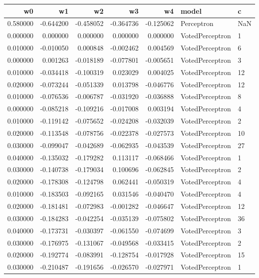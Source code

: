 \begin{tabular}{rrrrrll}
\toprule
w0 & w1 & w2 & w3 & w4 & model & c \\
\midrule
0.580000 & -0.644200 & -0.458052 & -0.364736 & -0.125062 & Perceptron & NaN \\
0.000000 & 0.000000 & 0.000000 & 0.000000 & 0.000000 & VotedPerceptron & 1 \\
0.010000 & -0.010050 & 0.000848 & -0.002462 & 0.004569 & VotedPerceptron & 6 \\
0.000000 & 0.001263 & -0.018189 & -0.077801 & -0.005651 & VotedPerceptron & 3 \\
0.010000 & -0.034418 & -0.100319 & 0.023029 & 0.004025 & VotedPerceptron & 12 \\
0.020000 & -0.073244 & -0.051339 & 0.013798 & -0.046776 & VotedPerceptron & 12 \\
0.010000 & -0.076536 & -0.006787 & -0.031920 & -0.036888 & VotedPerceptron & 8 \\
0.000000 & -0.085218 & -0.109216 & -0.017008 & 0.003194 & VotedPerceptron & 4 \\
0.010000 & -0.119142 & -0.075652 & -0.024208 & -0.032039 & VotedPerceptron & 2 \\
0.020000 & -0.113548 & -0.078756 & -0.022378 & -0.027573 & VotedPerceptron & 10 \\
0.030000 & -0.099047 & -0.042689 & -0.062935 & -0.043539 & VotedPerceptron & 27 \\
0.040000 & -0.135032 & -0.179282 & 0.113117 & -0.068466 & VotedPerceptron & 1 \\
0.030000 & -0.140738 & -0.179034 & 0.100696 & -0.062845 & VotedPerceptron & 2 \\
0.020000 & -0.178308 & -0.124798 & 0.062441 & -0.050319 & VotedPerceptron & 4 \\
0.010000 & -0.183503 & -0.092165 & 0.031546 & -0.040470 & VotedPerceptron & 4 \\
0.020000 & -0.181481 & -0.072983 & -0.001282 & -0.046647 & VotedPerceptron & 12 \\
0.030000 & -0.184283 & -0.042254 & -0.035139 & -0.075802 & VotedPerceptron & 36 \\
0.040000 & -0.173731 & -0.030397 & -0.061550 & -0.074699 & VotedPerceptron & 3 \\
0.030000 & -0.176975 & -0.131067 & -0.049568 & -0.033415 & VotedPerceptron & 2 \\
0.020000 & -0.192774 & -0.083991 & -0.128754 & -0.017928 & VotedPerceptron & 15 \\
0.030000 & -0.210487 & -0.191656 & -0.026570 & -0.027971 & VotedPerceptron & 1 \\

\end{tabular}
